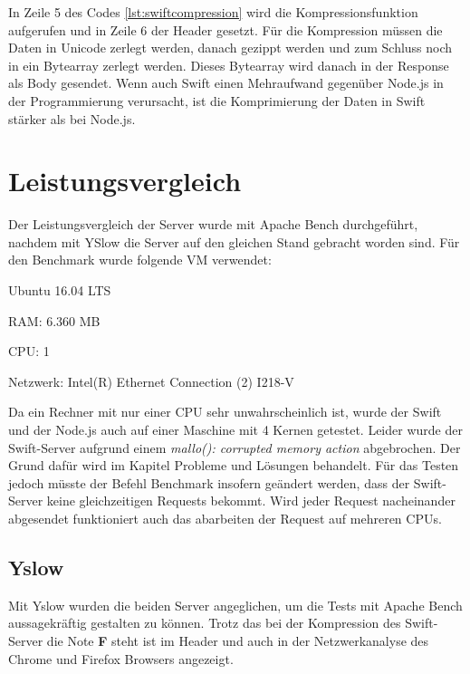 In Zeile 5 des Codes \ref{lst:swiftcompression} wird die Kompressionsfunktion aufgerufen und in Zeile 6 der Header gesetzt. Für die Kompression müssen die Daten in Unicode zerlegt werden, danach gezippt werden und zum Schluss noch in ein Bytearray zerlegt werden. Dieses Bytearray wird danach in der Response als Body gesendet. Wenn auch Swift einen Mehraufwand gegenüber Node.js in der Programmierung verursacht, ist die Komprimierung der Daten in Swift stärker als bei Node.js.

\section{Leistungsvergleich}
\label{sec:leistungsvergleich}
Der Leistungsvergleich der Server wurde mit Apache Bench durchgeführt, nachdem mit YSlow die Server auf den gleichen Stand gebracht worden sind.  Für den Benchmark wurde folgende VM verwendet:

\begin{compactitem}
\item Ubuntu 16.04 LTS
\item RAM: 6.360 MB
\item CPU: 1
\item Netzwerk: Intel(R) Ethernet Connection (2) I218-V
\end{compactitem}

Da ein Rechner mit nur einer CPU sehr unwahrscheinlich ist, wurde der Swift und der Node.js auch auf einer Maschine mit 4 Kernen getestet. Leider wurde der Swift-Server aufgrund einem \textit{mallo(): corrupted memory action} abgebrochen. Der Grund dafür wird im Kapitel Probleme und Lösungen behandelt. Für das Testen jedoch müsste der Befehl Benchmark insofern geändert werden, dass der Swift-Server keine gleichzeitigen Requests bekommt. Wird jeder Request nacheinander abgesendet funktioniert auch das abarbeiten der Request auf mehreren CPUs.

\subsection{Yslow}
Mit Yslow wurden die beiden Server angeglichen, um die Tests mit Apache Bench aussagekräftig gestalten zu können. Trotz das bei der Kompression des Swift-Server die Note \textbf{F} steht ist im Header und auch in der Netzwerkanalyse des Chrome und Firefox Browsers angezeigt.

